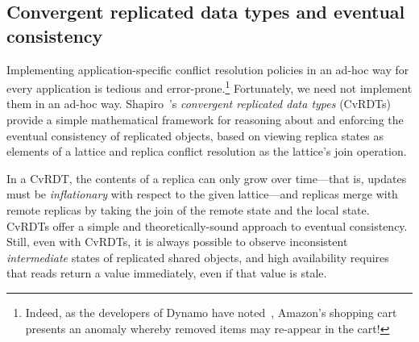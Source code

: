 \subsection{Convergent replicated data types and eventual consistency}

Implementing application-specific conflict resolution policies in an ad-hoc way for
every application is tedious and error-prone.\footnote{Indeed, as the
  developers of Dynamo have noted~\cite{dynamo}, Amazon's shopping
  cart presents an anomaly whereby removed items may
  re-appear in the cart!}  Fortunately, we need not implement them in an ad-hoc
way. Shapiro~\etal's \emph{convergent replicated data types}
(CvRDTs)~\cite{crdts,crdts-tr} provide a simple mathematical
framework for reasoning about and enforcing the eventual consistency
of replicated objects, based on viewing replica states as elements of
a lattice and replica conflict resolution as the lattice's join
operation.

In a CvRDT, the contents of a replica can only grow over time---that
is, updates must be \emph{inflationary} with respect to the given
lattice---and replicas merge with remote replicas by taking the join
of the remote state and the local state.
CvRDTs offer a simple and theoretically-sound approach to eventual
consistency.  Still, even with CvRDTs, it is always possible to
observe inconsistent \emph{intermediate} states of replicated shared
objects, and high availability requires that reads return a value
immediately, even if that value is stale.




